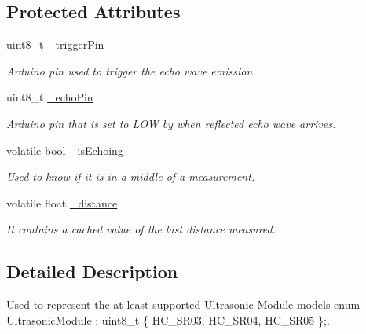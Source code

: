 \subsection*{Protected Attributes}
\begin{DoxyCompactItemize}
\item 
\mbox{\label{class_easyuino_1_1_distance_meter_a39f2305fe998cd3212eef389dfe036fe}} 
uint8\+\_\+t \hyperlink{class_easyuino_1_1_distance_meter_a39f2305fe998cd3212eef389dfe036fe}{\+\_\+trigger\+Pin}
\begin{DoxyCompactList}\small\item\em Arduino pin used to trigger the echo wave emission. \end{DoxyCompactList}\item 
\mbox{\label{class_easyuino_1_1_distance_meter_a6f4a18c48dc147102f1fae8cb12e24a2}} 
uint8\+\_\+t \hyperlink{class_easyuino_1_1_distance_meter_a6f4a18c48dc147102f1fae8cb12e24a2}{\+\_\+echo\+Pin}
\begin{DoxyCompactList}\small\item\em Arduino pin that is set to L\+OW by when reflected echo wave arrives. \end{DoxyCompactList}\item 
\mbox{\label{class_easyuino_1_1_distance_meter_ae2b9e4d3e8704c8f1a73639afd53614d}} 
volatile bool \hyperlink{class_easyuino_1_1_distance_meter_ae2b9e4d3e8704c8f1a73639afd53614d}{\+\_\+is\+Echoing}
\begin{DoxyCompactList}\small\item\em Used to know if it is in a middle of a measurement. \end{DoxyCompactList}\item 
volatile float \hyperlink{class_easyuino_1_1_distance_meter_ae10df1a21d2acfec3aa3eef57ea3a632}{\+\_\+distance}
\begin{DoxyCompactList}\small\item\em It contains a cached value of the last distance measured. \end{DoxyCompactList}\end{DoxyCompactItemize}


\subsection{Detailed Description}
Used to represent the at least supported Ultrasonic Module models enum Ultrasonic\+Module \+: uint8\+\_\+t \{ H\+C\+\_\+\+S\+R03, H\+C\+\_\+\+S\+R04, H\+C\+\_\+\+S\+R05 \};. 

